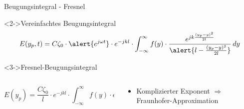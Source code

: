 \begin{frame}{Beugungsintegral - Fresnel}
    \begin{block}<2->{Vereinfachtes Beugungsintegral}
        \begin{equation*}
            E(y_p, t)
            =
            C\zeta_0 \cdot \alert{e^{j\omega t}} \cdot e^{-jkl} \cdot \int_{-\infty}^{\infty}f(y)\cdot\frac{e^{jk\frac{(y_p-y)^2}{2l}}}{\alert{l - \frac{(y_p-y)^2}{2l}}} \,dy
        \end{equation*}
    \end{block}
    \begin{exampleblock}<3->{Fresnel-Beugungsintegral}
        \begin{columns}
            \begin{column}{0.6\textwidth}
                \vspace*{\baselineskip}
                \begin{equation*}
                    E(y_p)
                    =
                    \frac{C\zeta_0}{l} \cdot e^{-jkl} \cdot \int_{-\infty}^{\infty}f(y)\cdot e^{jk\frac{(y_p^2 - 2y_py + y^2)}{2l}} \,dy
                \end{equation*}
                \vspace*{0.2\baselineskip}
            \end{column}
            \begin{column}{0.4\textwidth}
                \begin{itemize}
                    \item<4-> Komplizierter Exponent $\Rightarrow$ Fraunhofer-Approximation
                \end{itemize}
            \end{column}
        \end{columns}
    \end{exampleblock}
\end{frame}

